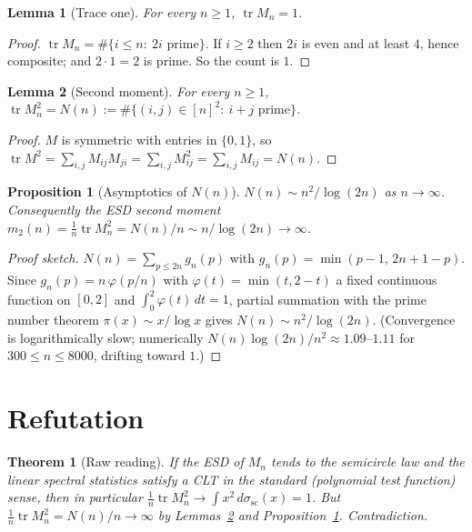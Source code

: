 \documentclass[11pt]{article}
\newtheorem{lemma}{Lemma}
\newtheorem{proposition}{Proposition}
\newtheorem{theorem}{Theorem}
\begin{document}
\begin{lemma}[Trace one]\label{lem:trace}
For every $n\ge 1$, $\operatorname{tr}M_n=1$.
\end{lemma}
\begin{proof}
$\operatorname{tr}M_n=\#\{i\le n:\ 2i \text{ prime}\}$. If $i\ge2$ then $2i$ is even and
at least $4$, hence composite; and $2\cdot1=2$ is prime. So the count is $1$.
\end{proof}

\begin{lemma}[Second moment]\label{lem:tr2}
For every $n\ge1$, $\operatorname{tr}M_n^2=N(n):=\#\{(i,j)\in[n]^2:\ i+j \text{ prime}\}$.
\end{lemma}
\begin{proof}
$M$ is symmetric with entries in $\{0,1\}$, so
$\operatorname{tr}M^2=\sum_{i,j}M_{ij}M_{ji}=\sum_{i,j}M_{ij}^2=\sum_{i,j}M_{ij}=N(n)$.
\end{proof}

\begin{proposition}[Asymptotics of $N(n)$]\label{prop:asymp}
$N(n)\sim n^2/\log(2n)$ as $n\to\infty$. Consequently the ESD second moment
$m_2(n)=\frac1n\operatorname{tr}M_n^2=N(n)/n\sim n/\log(2n)\to\infty$.
\end{proposition}
\begin{proof}[Proof sketch]
$N(n)=\sum_{p\le2n}g_n(p)$ with $g_n(p)=\min(p-1,\,2n+1-p)$. Since
$g_n(p)=n\,\varphi(p/n)$ with $\varphi(t)=\min(t,2-t)$ a fixed continuous function on
$[0,2]$ and $\int_0^2\varphi(t)\,dt=1$, partial summation with the prime number theorem
$\pi(x)\sim x/\log x$ gives $N(n)\sim n^2/\log(2n)$. (Convergence is logarithmically
slow; numerically $N(n)\log(2n)/n^2\approx1.09$--$1.11$ for $300\le n\le8000$, drifting
toward $1$.)
\end{proof}

\section{Refutation}

\begin{theorem}[Raw reading]\label{thm:raw}
If the ESD of $M_n$ tends to the semicircle law and the linear spectral statistics
satisfy a CLT in the standard (polynomial test function) sense, then in particular
$\frac1n\operatorname{tr}M_n^2\to\int x^2\,d\sigma_{\mathrm{sc}}(x)=1$.
But $\frac1n\operatorname{tr}M_n^2=N(n)/n\to\infty$ by
Lemmas~\ref{lem:tr2} and Proposition~\ref{prop:asymp}. Contradiction.
\end{theorem}
\end{document}
